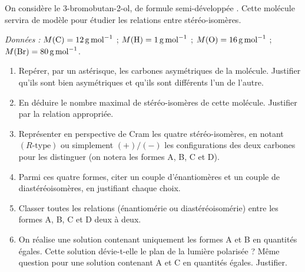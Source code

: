 \documentclass[11pt]{article}
\begin{document}
\begin{exercice}
On considère le 3-bromobutan-2-ol, de formule semi-développée . Cette molécule servira de modèle pour étudier les relations entre stéréo-isomères.

\medskip
\emph{Données :} $M(\ce{C}) = \SI{12}{g.mol^{-1}}$ ; $M(\ce{H}) = \SI{1}{g.mol^{-1}}$ ; $M(\ce{O}) = \SI{16}{g.mol^{-1}}$ ; $M(\ce{Br}) = \SI{80}{g.mol^{-1}}$.

\begin{enumerate}
\item Repérer, par un astérisque, les carbones asymétriques de la molécule. Justifier qu'ils sont bien asymétriques et qu'ils sont différents l'un de l'autre.
\item En déduire le nombre maximal de stéréo-isomères de cette molécule. Justifier par la relation appropriée.
\item Représenter en perspective de Cram les quatre stéréo-isomères, en notant $(R\text{-type})$ ou simplement $(+)/(-)$ les configurations des deux carbones pour les distinguer (on notera les formes A, B, C et D).
\item Parmi ces quatre formes, citer un couple d'énantiomères et un couple de diastéréoisomères, en justifiant chaque choix.
\item Classer toutes les relations (énantiomérie ou diastéréoisomérie) entre les formes A, B, C et D deux à deux.
\item On réalise une solution contenant uniquement les formes A et B en quantités égales. Cette solution dévie-t-elle le plan de la lumière polarisée ? Même question pour une solution contenant A et C en quantités égales. Justifier.
\end{enumerate}
\end{exercice}
\end{document}
